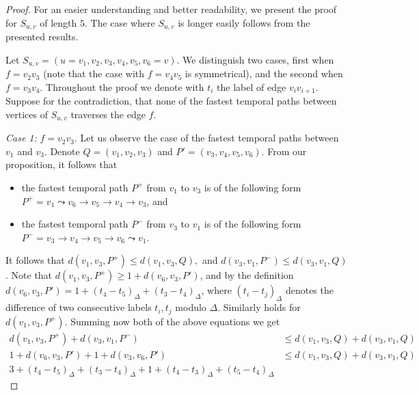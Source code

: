 \documentclass[a4paper,UKenglish,cleveref, autoref, thm-restate]{lipics-v2021}
\begin{document}
\begin{proof}
    For an easier understanding and better readability, we present the proof for $S_{u,v}$ of length $5$.
    The case where $S_{u,v}$ is longer easily follows from the presented results.

    Let $S_{u,v} = (u=v_1,v_2, v_3, v_4, v_5, v_6=v)$.
    We distinguish two cases, first when $f = v_2v_3$ (note that the case with $f = v_4v_5$ is symmetrical),
    and the second when  $f = v_3v_4$.
    Throughout the proof we denote with $t_i$ the label of edge $v_i v_{i+1}$.
    Suppose for the contradiction, that none of the fastest temporal paths between vertices of $S_{u,v}$ traverses the edge $f$.

    \emph{Case 1: }$f = v_2v_3$.
    Let us observe the case of the fastest temporal paths between $v_{1}$ and $v_{3}$.
    Denote $Q = (v_{1}, v_2, v_3)$ and $P' = (v_3,v_4,v_5,v_6)$.
    From our proposition, it follows that
    \begin{itemize}
        \item the fastest temporal path $P ^ +$ from $v_1$ to $v_3$ 
    is of the following form 
    $P^+ = v_{1}  \leadsto v_6 \rightarrow v_5 \rightarrow v_4 \rightarrow v_3$,
    and
        \item the fastest temporal path $P ^ -$ from $v_{3}$ to $v_{1}$ 
    is of the following form 
    $P^- = v_{3} \rightarrow v_{4} \rightarrow v_5 \rightarrow v_6 \leadsto v_1$.
    \end{itemize}
    It follows that 
    $
    d(v_{1}, v_{3}, P^+) \leq d(v_{1}, v_{3}, Q),
    $
    and
    $
    d(v_{3}, v_{1}, P^-) \leq d(v_{3}, v_{1}, Q)
    $. 
    Note that $d(v_{1}, v_{3}, P^+) \geq 1 + d(v_6,v_3,P')$,
    and by the definition $d(v_6,v_3,P') = 1 + (t_4 - t_5)_\Delta + (t_3 - t_4)_\Delta$,
    where $(t_i - t_j)_\Delta$ denotes the difference of two consecutive labels $t_i, t_j$ modulo $\Delta$.
    Similarly holds for $d(v_{1}, v_{3}, P^+)$.
    Summing now both of the above equations we get
    \begin{equation}
    \begin{split} \label{eq:FPT-prf-fUnlabeled}
        d(v_{1}, v_{3}, P^+) + d(v_{3}, v_{1}, P^-) &\leq 
        d(v_{1}, v_{3}, Q) + d(v_{3}, v_{1}, Q) \\
        1 + d(v_6,v_3,P') + 1 + d(v_3,v_6,P') &\leq d(v_{1}, v_{3}, Q) + d(v_{3}, v_{1}, Q) \\
        3 + (t_4 - t_5)_\Delta + (t_3 - t_4)_\Delta +
        1 + (t_4 - t_3)_\Delta + (t_5 - t_4)_\Delta 

\end{split}
\end{equation}
\end{proof}
\end{document}
